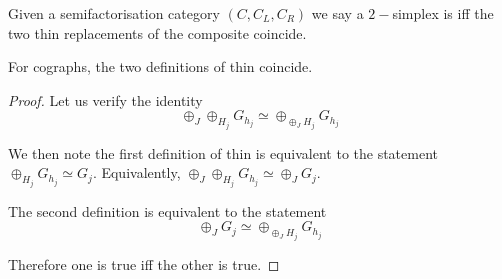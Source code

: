 Given a semifactorisation category $(C,C_L,C_R)$ we say a $2-$simplex is  iff the two thin replacements of the composite coincide.

\begin{proposition}
    For cographs, the two definitions of thin coincide. 
\end{proposition}
\begin{proof}
    

    Let us verify the identity $$\oplus_J\oplus_{H_j}G_{h_j}\simeq \oplus_{\oplus_J H_j}G_{h_j}$$

    We then note the first definition of thin is equivalent to the statement
    $\oplus_{H_j}G_{h_j}\simeq G_j$. Equivalently, $ \oplus_J\oplus_{H_j}G_{h_j}\simeq \oplus_J G_j$.

    The second definition is equivalent to the statement
    $$\oplus_J G_j\simeq \oplus_{\oplus_J H_j}G_{h_j}$$

    Therefore one is true iff the other is true.
\end{proof}

